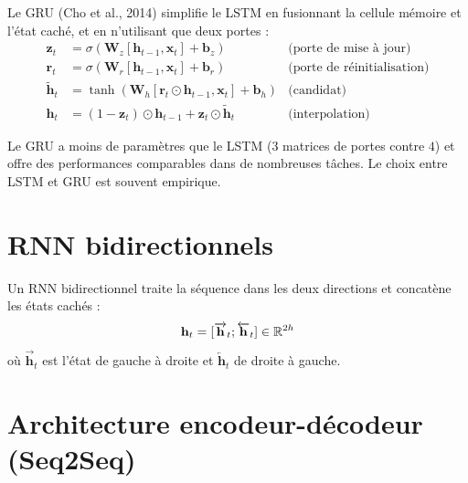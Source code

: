 \begin{definition}[GRU]
Le GRU (Cho et al., 2014) simplifie le LSTM en fusionnant la cellule m\'emoire
et l'\'etat cach\'e, et en n'utilisant que deux portes :
\begin{align}
\mathbf{z}_t &= \sigma(\mathbf{W}_z [\mathbf{h}_{t-1}, \mathbf{x}_t] + \mathbf{b}_z) & \text{(porte de mise \`a jour)} \\
\mathbf{r}_t &= \sigma(\mathbf{W}_r [\mathbf{h}_{t-1}, \mathbf{x}_t] + \mathbf{b}_r) & \text{(porte de r\'einitialisation)} \\
\tilde{\mathbf{h}}_t &= \tanh(\mathbf{W}_h [\mathbf{r}_t \odot \mathbf{h}_{t-1}, \mathbf{x}_t] + \mathbf{b}_h) & \text{(candidat)} \\
\mathbf{h}_t &= (1 - \mathbf{z}_t) \odot \mathbf{h}_{t-1} + \mathbf{z}_t \odot \tilde{\mathbf{h}}_t & \text{(interpolation)}
\end{align}
\end{definition}

\begin{remarque}
Le GRU a moins de param\`etres que le LSTM ($3$ matrices de portes contre $4$)
et offre des performances comparables dans de nombreuses t\^aches. Le choix
entre LSTM et GRU est souvent empirique.
\end{remarque}

\section{RNN bidirectionnels}
\label{sec:seq:bidirectional}

\begin{definition}[BiRNN]
Un RNN bidirectionnel traite la s\'equence dans les deux directions et
concat\`ene les \'etats cach\'es :
\[
\mathbf{h}_t = [\overrightarrow{\mathbf{h}}_t ; \overleftarrow{\mathbf{h}}_t] \in \mathbb{R}^{2h}
\]
o\`u $\overrightarrow{\mathbf{h}}_t$ est l'\'etat de gauche \`a droite et
$\overleftarrow{\mathbf{h}}_t$ de droite \`a gauche.
\end{definition}

\section{Architecture encodeur-d\'ecodeur (Seq2Seq)}
\label{sec:seq:seq2seq}


